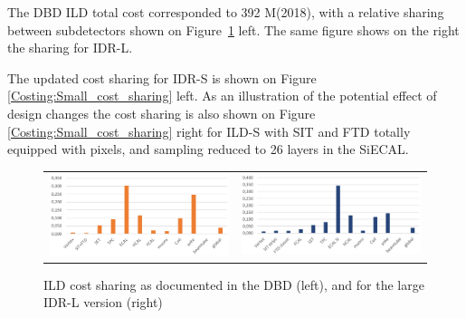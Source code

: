  The DBD ILD total cost corresponded to 392 M\texteuro(2018), with a relative sharing between subdetectors shown on Figure~\ref{fig:det:DBD_cost_sharing} left. The same figure shows on the right the sharing for IDR-L.
 
 The updated cost sharing for IDR-S is shown on Figure \ref{Costing:Small_cost_sharing} left. As an illustration of the potential effect of design changes the cost sharing is also shown on Figure \ref{Costing:Small_cost_sharing} right for ILD-S with SIT and FTD totally equipped with pixels, and sampling reduced to 26 layers in the SiECAL.
 
\begin{figure}[h!]
\begin{tabular}{cc}
\includegraphics[width=0.47\hsize]{Costing/DBD_cost_sharing.PNG}&
\includegraphics[width=0.47\hsize]{Costing/Large_cost_sharing.PNG}
\caption{ILD cost sharing as documented in the DBD (left), and for the large IDR-L version (right)}
\label{fig:det:DBD_cost_sharing}
\end{tabular}
\end{figure}


